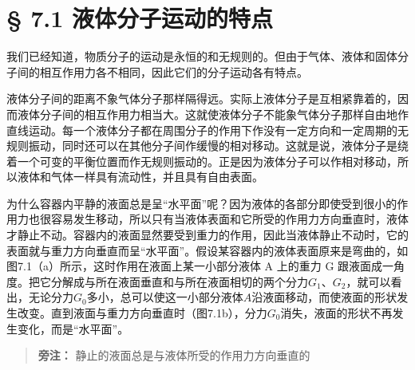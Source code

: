 \section{§ 7.1
液体分子运动的特点}\label{ux6db2ux4f53ux5206ux5b50ux8fd0ux52a8ux7684ux7279ux70b9}

我们已经知道，物质分子的运动是永恒的和无规则的。但由于气体、液体和固体分子间的相互作用力各不相同，因此它们的分子运动各有特点。

液体分子间的距离不象气体分子那样隔得远。实际上液体分子是互相紧靠着的，因而液体分子间的相互作用力相当大。这就使液体分子不能象气体分子那样自由地作直线运动。每一个液体分子都在周围分子的作用下作没有一定方向和一定周期的无规则振动，同时还可以在其他分子间作缓慢的相对移动。这就是说，液体分子是绕着一个可变的平衡位置而作无规则振动的。正是因为液体分子可以作相对移动，所以液体和气体一样具有流动性，并且具有自由表面。

为什么容器内平静的液面总是呈``水平面''呢？因为液体的各部分即使受到很小的作用力也很容易发生移动，所以只有当液体表面和它所受的作用力方向垂直时，液体才静止不动。容器内的液面显然要受到重力的作用，因此当液体静止不动时，它的表面就与重力方向垂直而呈``水平面''。假设某容器内的液体表面原来是弯曲的，如图7.1（a）所示，这时作用在液面上某一小部分液体
A 上的重力 G
跟液面成一角度。把它分解成与所在液面垂直和与所在液面相切的两个分力\(G_{1}\)、\(G_{2}\)，就可以看出，无论分力\(G_{0}\)多小，总可以使这一小部分液体\(A\)沿液面移动，而使液面的形状发生改变。直到液面与重力方向垂直时（图7.1b），分力\(G_{0}\)消失，液面的形状不再发生变化，而是``水平面''。

\begin{quote}
\textbf{旁注：} 静止的液面总是与液体所受的作用力方向垂直的
\end{quote}

